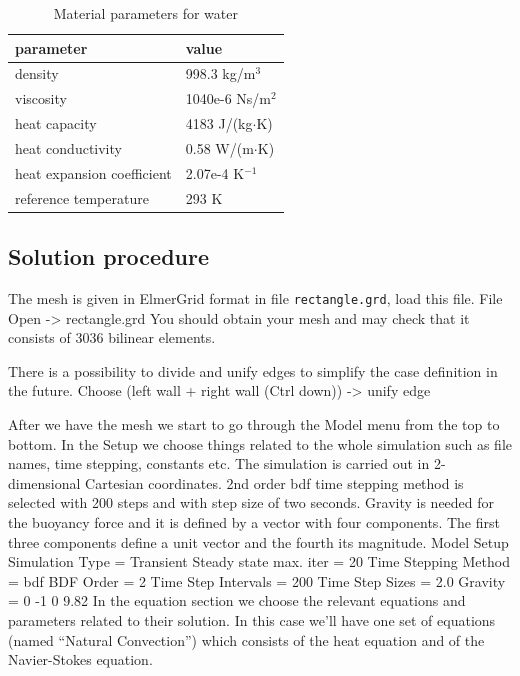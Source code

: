 \begin{table}[h]
\caption{Material parameters for water}
\label{tb:matpar}
\begin{center}
\begin{tabular}{ll} \hline
parameter  & value \\ \hline
density & 998.3 kg/m$^{3}$ \\
viscosity & 1040e-6 Ns/m$^{2}$ \\
heat capacity & 4183 J/(kg$\cdot$K) \\
heat conductivity & 0.58 W/(m$\cdot$K)       \\
heat expansion coefficient & 2.07e-4 K$^{-1}$      \\ 
reference temperature & 293 K       \\ \hline
\end{tabular}
\end{center}
\end{table}


\subsection*{Solution procedure}

The mesh is given in ElmerGrid format in file \texttt{rectangle.grd}, load this file.
\ttbegin
File 
  Open -> rectangle.grd
\ttend
You should obtain your mesh and may check that it consists of 3036 bilinear elements.

There is a possibility to divide and unify edges to simplify the case definition in the future.
\ttbegin
Choose (left wall + right wall (Ctrl down)) -> unify edge
\ttend

After we have the mesh we start to go through the Model menu from the top to bottom. 
In the Setup we choose things related to the whole simulation such as file names, 
time stepping, constants etc.
The simulation is carried out in 2-dimensional Cartesian
coordinates. 2nd order bdf time stepping method is selected with 200 steps
and with step size of two seconds.
Gravity is needed for the buoyancy force and it is defined by a vector with four components. 
The first three components define a unit vector and the fourth its magnitude. 
\ttbegin
Model
  Setup 
    Simulation Type = Transient
    Steady state max. iter = 20
    Time Stepping Method = bdf
    BDF Order = 2
    Time Step Intervals = 200
    Time Step Sizes = 2.0
    Gravity = 0 -1 0 9.82
\ttend
In the equation section we choose the relevant equations and parameters related to their solution. 
In this case we'll have one set of equations (named ``Natural Convection'') which consists of the heat equation and of the Navier-Stokes equation.

